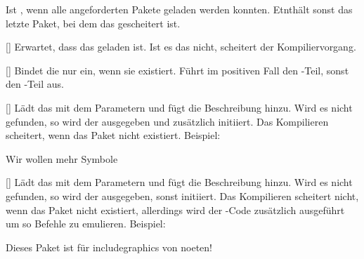 %
%
%

Ist , wenn alle angeforderten Pakete geladen werden konnten. Etnthält sonst das letzte Paket, bei dem das gescheitert ist.

%
%
%

[]
Erwartet, dass das  geladen ist. Ist es das nicht, scheitert der Kompiliervorgang.

%
%
%

[]
Bindet die  nur ein, wenn sie existiert. Führt im positiven Fall den -Teil, sonst den -Teil aus.

%
%
%

[]
Lädt das  mit dem Parametern  und fügt die Beschreibung  hinzu. Wird es nicht gefunden, so wird der  ausgegeben und zusätzlich  initiiert. Das Kompilieren scheitert, wenn das Paket nicht existiert.
Beispiel:
\begin{latex*}

    {Wir wollen mehr Symbole}%
    {}%
    {}
\end{latex*}

%
%
%

[]
Lädt das  mit dem Parametern  und fügt die Beschreibung  hinzu. Wird es nicht gefunden, so wird der  ausgegeben, sonst  initiiert. Das Kompilieren scheitert nicht, wenn das Paket nicht existiert, allerdings wird der -Code zusätzlich ausgeführt um so Befehle zu emulieren.
Beispiel:
\begin{latex*}

    {Dieses Paket ist für includegraphics von noeten!}
    {}
    {}{} %
\end{latex*}

%
%
%
%
%

